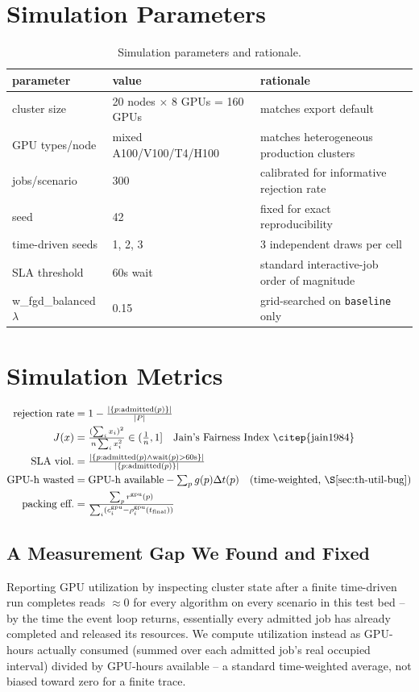 \documentclass[12pt]{report}
\begin{document}
\section{Simulation Parameters}
\begin{table}[h]
\centering
\caption{Simulation parameters and rationale.}
\small
\begin{tabular}{lll}
\toprule
parameter & value & rationale \\
\midrule
cluster size & 20 nodes $\times$ 8 GPUs = 160 GPUs & matches export default \\
GPU types/node & mixed A100/V100/T4/H100 & matches heterogeneous production clusters \\
jobs/scenario & 300 & calibrated for informative rejection rate \\
seed & 42 & fixed for exact reproducibility \\
time-driven seeds & 1, 2, 3 & 3 independent draws per cell \\
SLA threshold & 60s wait & standard interactive-job order of magnitude \\
w\_fgd\_balanced $\lambda$ & 0.15 & grid-searched on \texttt{baseline} only \\
\bottomrule
\end{tabular}
\end{table}

\section{Simulation Metrics}
\begin{align*}
  \text{rejection rate} &= 1-\tfrac{|\{p:\text{admitted}(p)\}|}{|P|} \\
  J(x) &= \tfrac{(\sum_i x_i)^2}{n\sum_i x_i^2}\in(\tfrac1n,1] \quad\text{Jain's Fairness Index \citep{jain1984}} \\
  \text{SLA viol.} &= \tfrac{|\{p:\text{admitted}(p)\wedge\text{wait}(p)>60\text{s}\}|}{|\{p:\text{admitted}(p)\}|} \\
  \text{GPU-h wasted} &= \text{GPU-h available} - \textstyle\sum_p g(p)\Delta t(p) \quad\text{(time-weighted, \S\ref{sec:th-util-bug})} \\
  \text{packing eff.} &= \tfrac{\sum_p r^{\text{gpu}}(p)}{\sum_i(c^{\text{gpu}}_i-\rho^{\text{gpu}}_i(t_{\text{final}}))}
\end{align*}

\subsection{A Measurement Gap We Found and Fixed}
\label{sec:th-util-bug}
Reporting GPU utilization by inspecting cluster state after a finite
time-driven run completes reads $\approx0$ for every algorithm on every
scenario in this test bed -- by the time the event loop returns,
essentially every admitted job has already completed and released its
resources. We compute utilization instead as GPU-hours actually consumed
(summed over each admitted job's real occupied interval) divided by
GPU-hours available -- a standard time-weighted average, not biased
toward zero for a finite trace.
\end{document}
